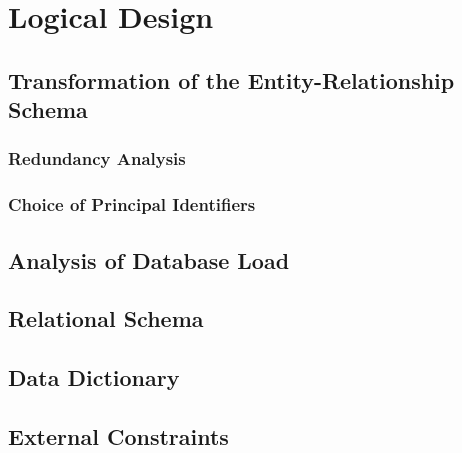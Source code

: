 \section{Logical Design}

\subsection{Transformation of the Entity-Relationship Schema}


\subsubsection{Redundancy Analysis}

\subsubsection{Choice of Principal Identifiers}

\subsection{Analysis of Database Load}

\subsection{Relational Schema}

\subsection{Data Dictionary}



\subsection{External Constraints}